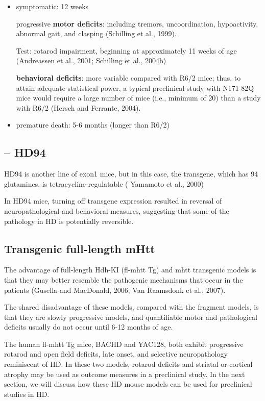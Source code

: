 \begin{itemize}
  \item symptomatic: 12 weeks
  
progressive {\bf motor deficits}: including tremors, uncoordination,
hypoactivity, abnormal gait, and clasping (Schilling et al., 1999).

Test: rotarod impairment, beginning at approximately 11 weeks of age (Andreassen
et al., 2001; Schilling et al., 2004b)

{\bf behavioral deficits}: more variable compared with R6/2 mice; thus, to
attain adequate statistical power, a typical preclinical study with N171-82Q mice would
require a large number of mice (i.e., minimum of 20) than a study with R6/2
(Hersch and Ferrante, 2004).

  \item premature death: 5-6 months (longer than R6/2)
\end{itemize}



\subsection{-- HD94}
\label{sec:mouse-HD94}

HD94 is another line of exon1 mice, but in this case, the transgene, which has
94 glutamines, is tetracycline-regulatable ( Yamamoto et al., 2000)

In HD94 mice, turning off transgene expression resulted in reversal of
neuropathological and behavioral measures, suggesting that some of the pathology
in HD is potentially reversible. 


\subsection{Transgenic full-length mHtt}
\label{sec:HD-mouse-model-full-length-mHtt-transgenic}
The advantage of full-length Hdh-KI (fl-mhtt Tg) and mhtt transgenic models
is that they may better resemble the pathogenic mechanisms that occur in the
patients (Gusella and MacDonald, 2006; Van Raamsdonk et al., 2007).

The shared disadvantage of these models, compared with the fragment models, is
that they are slowly progressive models, and quantifiable motor and pathological
deficits usually do not occur until 6-12 months of age.

The human fl-mhtt Tg mice, BACHD and YAC128, both exhibit progressive rotarod
and open field deficits, late onset, and selective neuropathology reminiscent of
HD. In these two models, rotarod deficits and striatal or cortical
atrophy may be used as outcome measures in a preclinical study. In the next
section, we will discuss how these HD mouse models can be used for preclinical
studies in HD.

